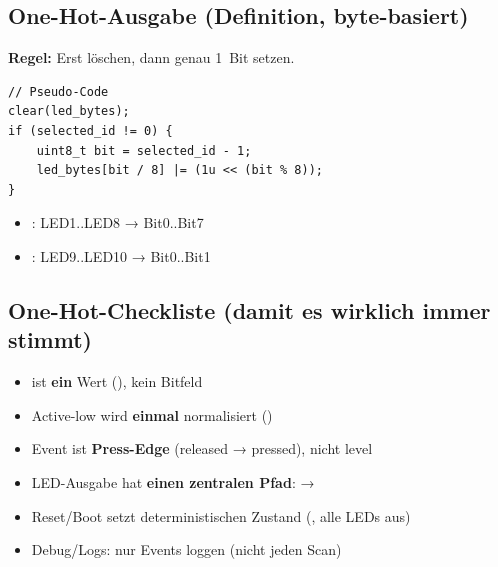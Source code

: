 \subsection{One-Hot-Ausgabe (Definition, byte-basiert)}
\label{sec:one-hot-ausgabe}

\textbf{Regel:} Erst löschen, dann genau 1~Bit setzen.

\begin{lstlisting}[style=arduino]
// Pseudo-Code
clear(led_bytes);
if (selected_id != 0) {
    uint8_t bit = selected_id - 1;
    led_bytes[bit / 8] |= (1u << (bit % 8));
}
\end{lstlisting}

\begin{infobox}
\begin{itemize}
  \item {}: LED1..LED8 → Bit0..Bit7
  \item {}: LED9..LED10 → Bit0..Bit1
\end{itemize}
\end{infobox}

\subsection{One-Hot-Checkliste (damit es wirklich immer stimmt)}
\label{sec:one-hot-checkliste}

\begin{itemize}
  \item[$\square$]  ist \textbf{ein} Wert (), kein Bitfeld
  \item[$\square$] Active-low wird \textbf{einmal} normalisiert ()
  \item[$\square$] Event ist \textbf{Press-Edge} (released → pressed), nicht \glqq level\grqq
  \item[$\square$] LED-Ausgabe hat \textbf{einen zentralen Pfad}:  → 
  \item[$\square$] Reset/Boot setzt deterministischen Zustand (\zB {}, alle LEDs aus)
  \item[$\square$] Debug/Logs: nur Events loggen (nicht jeden Scan)
\end{itemize}
